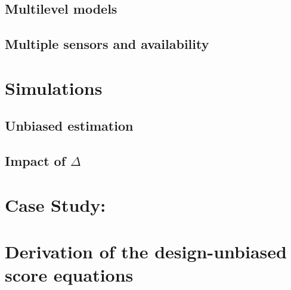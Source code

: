\documentclass[11pt]{amsart}
\begin{document}
\subsection{Multilevel models}

\subsection{Multiple sensors and availability}

\section{Simulations}

\subsection{Unbiased estimation}

\subsection{Impact of $\Delta$}

\section{Case Study: }




\appendix

\section{Derivation of the design-unbiased score equations}
\end{document}
